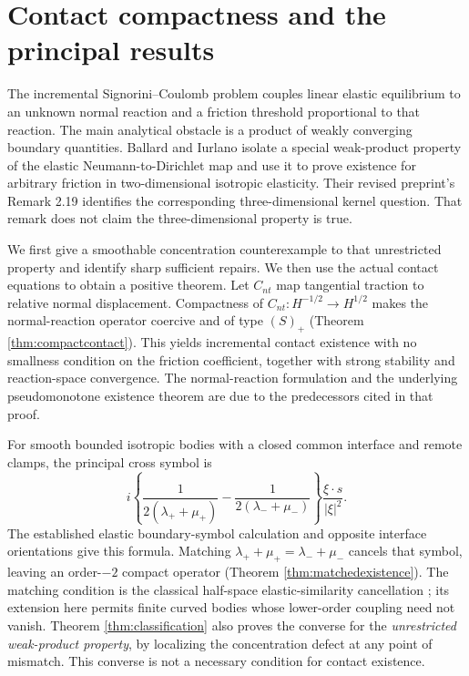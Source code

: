 \documentclass[11pt,a4paper]{article}
\theoremstyle{definition}\newtheorem{definition}[theorem]{Definition}
\theoremstyle{remark}\newtheorem{remark}[theorem]{Remark}
\numberwithin{equation}{section}
\begin{document}
\section{Contact compactness and the principal results}\label{sec:scopeintro}
The incremental Signorini--Coulomb problem couples linear elastic equilibrium to an unknown normal reaction and a friction threshold proportional to that reaction. The main analytical obstacle is a product of weakly converging boundary quantities. Ballard and Iurlano \cite{BI} isolate a special weak-product property of the elastic Neumann-to-Dirichlet map and use it to prove existence for arbitrary friction in two-dimensional isotropic elasticity. Their revised preprint's Remark 2.19 identifies the corresponding three-dimensional kernel question. That remark does not claim the three-dimensional property is true.

We first give a smoothable concentration counterexample to that unrestricted property and identify sharp sufficient repairs. We then use the actual contact equations to obtain a positive theorem. Let $C_{nt}$ map tangential traction to relative normal displacement. Compactness of $C_{nt}:H^{-1/2}\to H^{1/2}$ makes the normal-reaction operator coercive and of type $(S)_+$ (Theorem \ref{thm:compactcontact}). This yields incremental contact existence with no smallness condition on the friction coefficient, together with strong stability and reaction-space convergence. The normal-reaction formulation and the underlying pseudomonotone existence theorem are due to the predecessors cited in that proof.

For smooth bounded isotropic bodies with a closed common interface and remote clamps, the principal cross symbol is
\[
 i\left\{\frac1{2(\lambda_++\mu_+)}-\frac1{2(\lambda_-+\mu_-)}\right\}
 \frac{\xi\cdot s}{|\xi|^2}.
\]
The established elastic boundary-symbol calculation \cite{TanLiu} and opposite interface orientations give this formula. Matching $\lambda_++\mu_+=\lambda_-+\mu_-$ cancels that symbol, leaving an order-$-2$ compact operator (Theorem \ref{thm:matchedexistence}). The matching condition is the classical half-space elastic-similarity cancellation \cite{ArgatovMishuris}; its extension here permits finite curved bodies whose lower-order coupling need not vanish. Theorem \ref{thm:classification} also proves the converse for the \emph{unrestricted weak-product property}, by localizing the concentration defect at any point of mismatch. This converse is not a necessary condition for contact existence.
\end{document}
